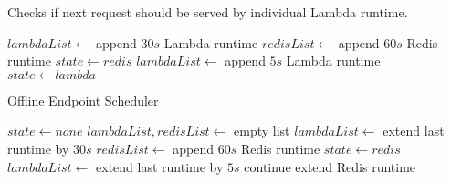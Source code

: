 \begin{algorithm}[H]
    \caption{Checks if next request should be served by individual Lambda runtime.}\label{alg:offline_endpoint_scheduler2}
    \small
    \begin{algorithmic}
                \State $lambdaList \gets$ append $30s$ Lambda runtime
                \State $redisList \gets$ append $60s$ Redis runtime
                \State $state \gets redis$
            \Else
                \State $lambdaList \gets$ append $5s$ Lambda runtime
                \State $state \gets lambda$
            \EndIf
        \EndProcedure
    \end{algorithmic}
\end{algorithm}
\begin{algorithm}[H]
    \caption{Offline Endpoint Scheduler}\label{alg:offline_endpoint_scheduler}
    \small
    \begin{algorithmic}
        \State $state \gets none$
        \State $lambdaList, redisList \gets$ empty list 
                \State {}
            \EndCase
                        \State $lambdaList \gets$ extend last runtime by $30s$
                        \State $redisList \gets$ append $60s$ Redis runtime
                        \State $state \gets redis$
                    \Else
                        \State $lambdaList \gets$ extend last runtime by $5s$
                    \EndIf
                \Else
                    \State {} 
                \EndIf
            \EndCase
                    \State continue
                 
                    \State extend Redis runtime
                \Else
                    \State {}
                \EndIf
            \EndCase
        \EndSwitch
        \EndWhile
    \end{algorithmic}
\end{algorithm}